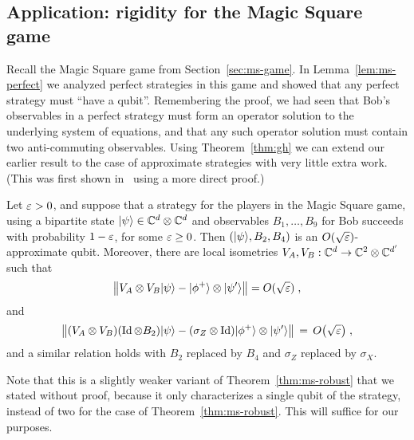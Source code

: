 \subsection{Application: rigidity for the Magic Square game}

Recall the Magic Square game from Section~\ref{sec:ms-game}. In Lemma~\ref{lem:ms-perfect} we analyzed perfect strategies in this game and showed that any perfect strategy must ``have a qubit''. Remembering the proof, we had seen that Bob's observables in a perfect strategy must form an operator solution to the underlying system of equations, and that any such operator solution must contain two anti-commuting observables. Using Theorem~\ref{thm:gh} we can extend our earlier result to the case of approximate strategies with very little extra work. (This was first shown in~\cite{wu2016device} using a more direct proof.)

\begin{theorem}\label{thm:rigid-ms}
Let $\varepsilon>0$, and suppose that a strategy for the players  in the Magic Square game, using  a bipartite state $|\psi\rangle\in\mathbb{C}^d\otimes \mathbb{C}^d$ and observables $B_1,\ldots,B_9$ for Bob succeeds with probability $1-\varepsilon$, for some $\varepsilon \geq 0$. Then $(|\psi\rangle,B_2,B_4)$ is an $O(\sqrt{\varepsilon})$-approximate qubit. Moreover, there are local isometries $V_A,V_B:\mathbb{C}^d \to \mathbb{C}^2 \otimes \mathbb{C}^{d'}$ such that 
\begin{equation}\label{eq:chsh-state}
\big\| V_A \otimes V_B |\psi\rangle - |\phi^+\rangle \otimes |\psi'\rangle \big\| = O(\sqrt{\varepsilon}) \;,
\end{equation}
and 
\begin{equation}\label{eq:chsh-alice}
\big\|( V_A \otimes V_B)( \mathop{\rm Id}\nolimits \otimes B_2 )|\psi\rangle - (\sigma_Z \otimes \mathop{\rm Id}\nolimits) |\phi^+\rangle \otimes |\psi'\rangle \big\| \,=\, O\big(\sqrt{\varepsilon}\big)\;,
\end{equation}
and a similar relation holds with $B_2$ replaced by $B_4$ and $\sigma_Z$ replaced by $\sigma_X$. 
\end{theorem}

Note that this is a slightly weaker variant of Theorem~\ref{thm:ms-robust} that we stated without proof, because it only characterizes a single qubit of the strategy, instead of two for the case of Theorem~\ref{thm:ms-robust}. This will suffice for our purposes. 

